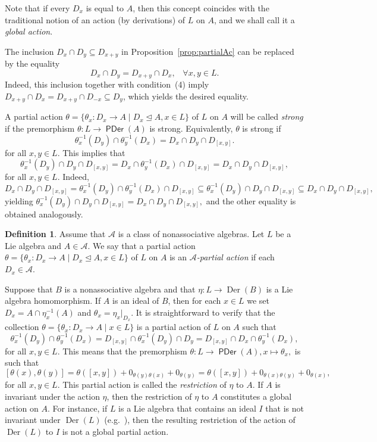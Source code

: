 \documentclass[10pt,a4paper]{amsart}
\theoremstyle{definition}
\newtheorem{defn}[thm]{Definition}
\theoremstyle{remark}
\numberwithin{equation}{section}
\newtheorem*{Theorem A}{\textbf{Theorem A}}
\newtheorem*{Corollary E}{\textbf{Corollary E}}
\newtheorem*{Corollary F}{\textbf{Corollary F}}
\newtheorem*{Theorem B}{\textbf{Theorem B}}
\newtheorem*{Theorem C}{\textbf{Theorem C}}
\newtheorem*{Theorem D}{\textbf{Theorem B}}
\newtheorem*{p a}{\textbf{Proof of  Theorem A}}
\newtheorem*{p b}{\textbf{Proof of Theorem B}}
\newtheorem*{p c}{\textbf{Proof of  Theorem C}}
\newtheorem*{p d}{\textbf{Proof of  Theorem D}}
\newcommand{\0}{{\vartheta}}
\DeclareMathOperator{\der}{Der}
\DeclareMathOperator{\pde}{\textsf{PDer}}
\begin{document}
Note that if every $D_x$ is equal to $A$, then this concept coincides with the traditional notion of an action (by derivations) of $L$ on $A$, and we shall call it a {\em global action}. 


The inclusion $D_x\cap D_y\subseteq D_{x+y}$ in  Proposition~\ref{prop:partialAc} can be replaced by the equality $$D_x\cap D_y=D_{x+y}\cap D_x, \;\;\; \forall x,y \in L.$$
 Indeed, this inclusion together with condition~(4) imply $D_{x+y}\cap D_{x}=D_{x+y}\cap D_{-x}\subseteq D_y$, which yields the desired equality.

A partial action $\theta=\{\theta_x: D_{x} \rightarrow A\mid D_x\unlhd A, x\in L \}$ of $L$ on $A$ will be called {\em strong }  if  the premorphism 
$\theta : L \to  \pde(A)$ is strong. Equivalently, 
$\theta $ is strong if 
$$\theta_x^{-1} (D_{y} )\cap \theta_{y}^{-1} (D_x)=D_x\cap D_y \cap D_{[x,y]}.$$
for all $x,y\in L.$ This implies that
$$ \theta^{-1}_x(D_y)\cap D_y  \cap D_{[x,y]} =
D_x \cap \theta^{-1}_y (D_x)  \cap D_{[x,y]} = D_x\cap D_y \cap D_{[x,y]}, $$ for all $x, y\in L$. 
Indeed,  
$$D_x\cap D_y  \cap D_{[x,y]}=\theta_x^{-1} (D_{y} )\cap \theta_{y}^{-1} (D_x) \cap D_{[x,y]} \subseteq \theta^{-1}_x(D_y)\cap D_y \cap D_{[x,y]} \subseteq D_x\cap D_y \cap D_{[x,y]},$$
yielding $\theta^{-1}_x(D_y)\cap D_y \cap D_{[x,y]} = D_x\cap D_y \cap D_{[x,y]},$ and the other equality is obtained analogously.

\begin{defn}
Assume that $\mathcal A$  is a class of nonassociative algebras. Let $L$ be a Lie algebra and $A\in \mathcal{A}$. We say that a  partial action  $\theta=\{\theta_x: D_{x} \rightarrow A\mid D_x\unlhd A, x\in L \}$ of $L$ on $A$ is an {\em $\mathcal{A}$-partial action} if  each $D_x\in \mathcal{A}$.
\end{defn}

Suppose that $B$ is a nonassociative algebra and that $\eta: L\to \der(B)$ is a Lie algebra homomorphism. If $A$ is an ideal of $B$, then for each $x\in L$ we set  $D_x=A\cap \eta_x^{-1}(A)$ and $\theta_x=\eta_x|_{{D_x}}.$ It is straightforward to verify that the collection $\theta=\{\theta_x: D_{x} \rightarrow A\mid x\in L \}$ is a partial action of $L$ on $A$  such that 
$$\theta_x^{-1} (D_{y} )\cap \theta_{y}^{-1} (D_x)= D_{[x,y]}\cap \theta_x^{-1} (D_{y} )\cap D_y =
D_{[x,y]} \cap D_x \cap \theta_y^{-1} (D_{x} ) , $$ for all $x,y\in L.$ This means that the premorphism 
$\theta: L\to \pde(A), x \mapsto \theta _x ,$ is such that 
$$[\theta(x),\theta(y)]=\theta([x,y])+0_{\theta(y)\theta(x)}+0_{\theta(y)} =\theta([x,y])+0_{\theta(x)\theta(y)}+0_{\theta(x)},$$ for all $x,y\in L.$
This partial action is called the {\em restriction } of $\eta$ to $A$. If $A$ is invariant under the action $\eta$, then the restriction of $\eta$ to $A$ constitutes a global action on $A$. For instance,  if $L$ is a Lie algebra that contains an ideal $I$ that is not invariant under $\der(L)$ (e.g.~\cite[p. 75]{Ja}), then the resulting restriction of the action of $\der(L)$ to $I$ is not a  global partial action.
\end{document}
